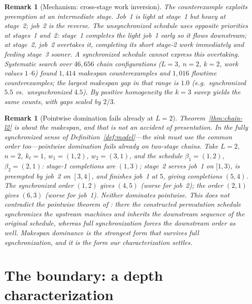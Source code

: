 \documentclass[sn-mathphys,NameDate]{sn-jnl}
\theoremstyle{thmstyleone}
\theoremstyle{thmstylethree}
\theoremstyle{thmstyletwo}
\newtheorem{remark}[theorem]{Remark}
\begin{document}
\begin{remark}[Mechanism: cross-stage work inversion]
\label{rem:mechanism}
The counterexample exploits preemption at an intermediate
stage. Job~1 is light at stage~1 but heavy at stage~2; job~2
is the reverse. The unsynchronized schedule uses opposite
priorities at stages~1 and~2: stage~1 completes the light
job~1 early so it flows downstream; at stage~2, job~2
overtakes it, completing its short stage-2 work immediately
and feeding stage~3 sooner. A synchronized schedule cannot
express this overtaking. Systematic search over $46{,}656$
chain configurations ($L = 3$, $n = 2$, $k = 2$, work
values $1$--$6$) found $1{,}414$ makespan counterexamples and
$1{,}016$ flowtime counterexamples; the largest makespan gap
in that range is $1.0$ (e.g.\ synchronized $5.5$ vs.\
unsynchronized $4.5$). By positive homogeneity the $k = 3$
sweep yields the same counts, with gaps scaled by $2/3$.
\end{remark}

\begin{remark}[Pointwise domination fails already at $L = 2$]
\label{rem:pointwise}
Theorem~\ref{thm:chain-l2} is about the makespan, and that is
not an accident of presentation. In the fully synchronized
sense of Definition~\ref{def:model}---the sink must use the
common order too---\emph{pointwise} domination fails already
on two-stage chains. Take $L = 2$, $n = 2$, $k_\ell = 1$,
$w_1 = (1, 2)$, $w_2 = (3, 1)$, and the schedule
$\beta_1 = (1,2)$, $\beta_2 = (2,1)$: stage-1 completions are
$(1, 3)$; stage~2 serves job~1 on $[1,3)$, is preempted by
job~2 on $[3,4]$, and finishes job~1 at $5$, giving
completions $(5, 4)$. The synchronized order $(1,2)$ gives
$(4, 5)$ (worse for job~2); the order $(2,1)$ gives $(6, 3)$
(worse for job~1). Neither dominates pointwise. This does not
contradict the pointwise theorem of \citet{bowmanA}: there the
constructed permutation schedule synchronizes the
\emph{upstream} machines and \emph{inherits} the downstream
sequence of the original schedule, whereas full
synchronization forces the downstream order as well. Makespan
dominance is the strongest form that survives full
synchronization, and it is the form our characterization
settles.
\end{remark}

\section{The boundary: a depth characterization}
\label{sec:boundary}
\end{document}
